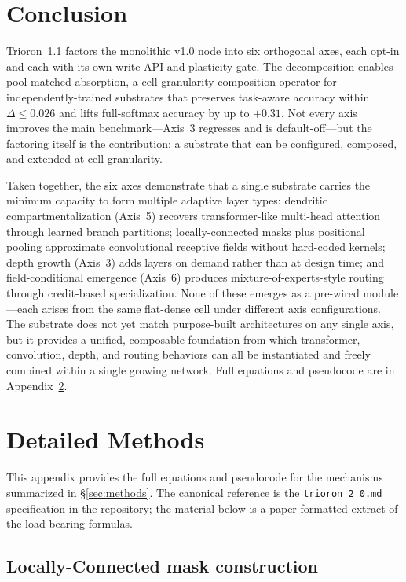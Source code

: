 \documentclass[11pt]{article}
\begin{document}
\section{Conclusion}
\label{sec:conclusion}

Trioron~1.1 factors the monolithic v1.0 node into six orthogonal axes,
each opt-in and each with its own write API and plasticity gate.
The decomposition enables pool-matched absorption, a cell-granularity
composition operator for independently-trained substrates that preserves
task-aware accuracy within $\Delta \leq 0.026$ and lifts full-softmax
accuracy by up to $+0.31$.
Not every axis improves the main benchmark---Axis~3 regresses and is
default-off---but the factoring itself is the contribution: a substrate
that can be configured, composed, and extended at cell granularity.

Taken together, the six axes demonstrate that a single substrate carries
the minimum capacity to form multiple adaptive layer types: dendritic
compartmentalization (Axis~5) recovers transformer-like multi-head
attention through learned branch partitions; locally-connected masks
plus positional pooling approximate convolutional receptive fields
without hard-coded kernels; depth growth (Axis~3) adds layers on demand
rather than at design time; and field-conditional emergence (Axis~6)
produces mixture-of-experts-style routing through credit-based
specialization.
None of these emerges as a pre-wired module---each arises from the same
flat-dense cell under different axis configurations.
The substrate does not yet match purpose-built architectures on any
single axis, but it provides a unified, composable foundation from which
transformer, convolution, depth, and routing behaviors can all be
instantiated and freely combined within a single growing network.
Full equations and pseudocode are in Appendix~\ref{sec:detail}.


\appendix


\section{Detailed Methods}
\label{sec:detail}

This appendix provides the full equations and pseudocode for the
mechanisms summarized in \S\ref{sec:methods}.
The canonical reference is the \texttt{trioron\_2\_0.md} specification in
the repository; the material below is a paper-formatted extract of the
load-bearing formulas.

\subsection{Locally-Connected mask construction}
\label{sec:detail-lcn}
\end{document}
